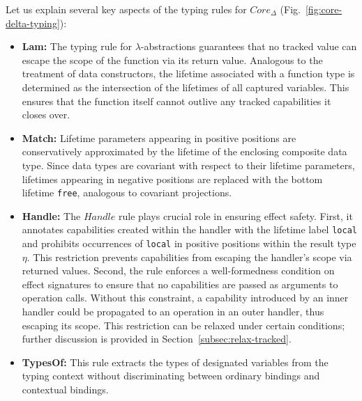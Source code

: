 \documentclass[acmsmall,review,screen]{acmart}
\begin{document}
Let us explain several key aspects of the typing rules for $Core_\Delta$ (Fig.\ \ref{fig:core-delta-typing}):
\begin{itemize}
    \item \textbf{Lam:} The typing rule for $\lambda$-abstractions guarantees that no tracked value can escape the scope of the function via its return value.
    Analogous to the treatment of data constructors, the lifetime associated with a function type is determined as the intersection of the lifetimes of all captured variables.
    This ensures that the function itself cannot outlive any tracked capabilities it closes over. %
    \item \textbf{Match:} Lifetime parameters appearing in positive positions are conservatively approximated by the lifetime of the enclosing composite data type.
    Since data types are covariant with respect to their lifetime parameters, lifetimes appearing in negative positions are replaced with the bottom lifetime \texttt{free}, analogous to covariant projections. %
    \item \textbf{Handle:} The $Handle$ rule plays crucial role in ensuring effect safety.
    First, it annotates capabilities created within the handler with the lifetime label \texttt{local} and prohibits occurrences of \texttt{local} in positive positions within the result type $\eta$.
    This restriction prevents capabilities from escaping the handler’s scope via returned values.
    Second, the rule enforces a well-formedness condition on effect signatures to ensure that no capabilities are passed as arguments to operation calls. %
    Without this constraint, a capability introduced by an inner handler could be propagated to an operation in an outer handler, thus escaping its scope.
    This restriction can be relaxed under certain conditions; further discussion is provided in Section~\ref{subsec:relax-tracked}.
    \item \textbf{TypesOf:} This rule extracts the types of designated variables from the typing context without discriminating between ordinary bindings and contextual bindings.
\end{itemize}


\end{document}

